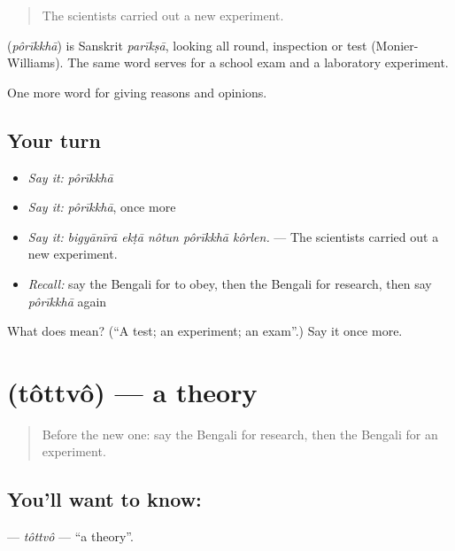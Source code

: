 \begin{quote}
The scientists carried out a new experiment.
\end{quote}

\begin{cousinweb}
\textbf{} (\emph{pôrīkkhā}) is Sanskrit \emph{parīkṣā}, looking all round, inspection or test (Monier-Williams). The same word serves for a school exam and a laboratory experiment.
\end{cousinweb}

\begin{grammarlens}[title={What you've built}]
One more word for giving reasons and opinions.
\end{grammarlens}

\subsection*{Your turn}
\begin{itemize}
\raggedright
  \item \emph{Say it:} \emph{pôrīkkhā}
  \item \emph{Say it:} \emph{pôrīkkhā}, once more
  \item \emph{Say it:} \emph{bigyānīrā ekṭā nôtun pôrīkkhā kôrlen.} — The scientists carried out a new experiment.
  \item \emph{Recall:} say the Bengali for to obey, then the Bengali for research, then say \emph{pôrīkkhā} again
\end{itemize}

\begin{tcolorbox}[breakable,colback=teal!4,colframe=teal!35!black,title={Before you move on}]
What does  mean? (\textquotedblleft{}A test; an experiment; an exam\textquotedblright{}.) Say it once more.
\end{tcolorbox}
\section[\texorpdfstring{\bn{তত্ত্ব} (tôttvô)}{তত্ত্ব (tôttvô)}]{ (tôttvô) — a theory}

\label{lesson:BN-C354-tottvo}



\begin{quote}
Before the new one: say the Bengali for research, then the Bengali for an experiment.
\end{quote}

\subsection*{You'll want to know: }
\textbf{} — \emph{tôttvô} — \textquotedblleft{}a theory\textquotedblright{}.

